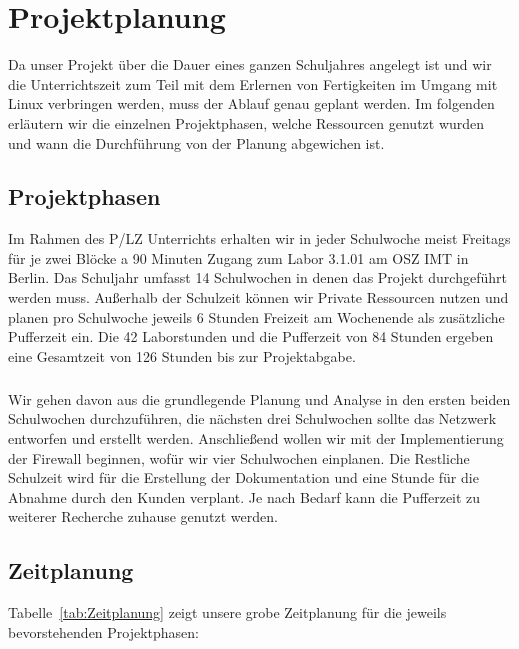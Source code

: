 \section{Projektplanung} 
\label{sec:Projektplanung}

Da unser Projekt über die Dauer eines ganzen Schuljahres angelegt ist und wir die Unterrichtszeit zum Teil mit dem Erlernen von Fertigkeiten im Umgang mit Linux verbringen werden, muss der Ablauf genau geplant werden. Im folgenden erläutern wir die einzelnen Projektphasen, welche Ressourcen genutzt wurden und wann die Durchführung von der Planung abgewichen ist.

\subsection{Projektphasen}
\label{sec:Projektphasen}
Im Rahmen des P/LZ Unterrichts erhalten wir in jeder Schulwoche meist Freitags für je zwei Blöcke a 90 Minuten Zugang zum Labor 3.1.01 am OSZ IMT in Berlin. Das Schuljahr umfasst 14 Schulwochen in denen das Projekt durchgeführt werden muss. Außerhalb der Schulzeit können wir Private Ressourcen nutzen und planen pro Schulwoche jeweils 6 Stunden Freizeit am Wochenende als zusätzliche Pufferzeit ein. Die 42 Laborstunden und die Pufferzeit von 84 Stunden ergeben eine Gesamtzeit von 126 Stunden bis zur Projektabgabe.
\subparagraph*{} Wir gehen davon aus die grundlegende Planung und Analyse in den ersten beiden Schulwochen durchzuführen, die nächsten drei Schulwochen sollte das Netzwerk entworfen und erstellt werden. Anschließend wollen wir mit der Implementierung der Firewall beginnen, wofür wir \ca vier Schulwochen einplanen. Die Restliche Schulzeit wird für die Erstellung der Dokumentation und eine Stunde für die Abnahme durch den Kunden verplant. Je nach Bedarf kann die Pufferzeit zu weiterer Recherche zuhause genutzt werden.

\subsection{Zeitplanung}
\label{sec:Zeitplanung}

Tabelle~\ref{tab:Zeitplanung} zeigt unsere grobe Zeitplanung für die jeweils bevorstehenden Projektphasen:

